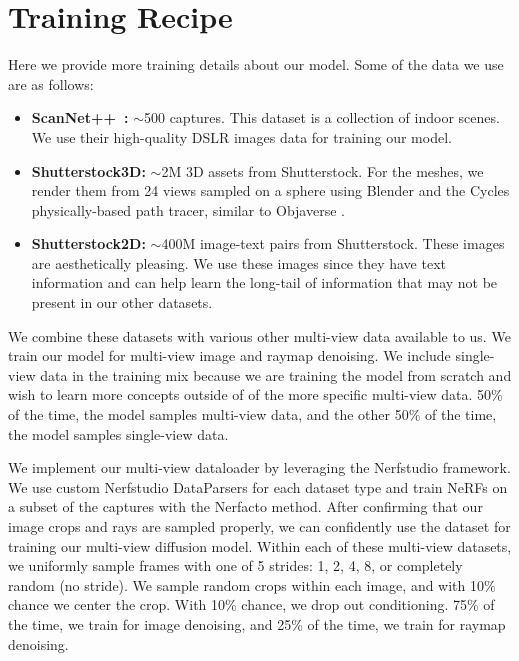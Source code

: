 \section{Training Recipe}

Here we provide more training details about our model. Some of the data we use are as follows:
\begin{itemize}
  \item \textbf{ScanNet++~\cite{yeshwanth2023scannet++}:}
  $\sim$500 captures. This dataset is a collection of indoor scenes. We use their high-quality DSLR images data for training our model.

  \item \textbf{Shutterstock3D:}
  $\sim$2M 3D assets from Shutterstock. For the meshes, we render them from 24 views sampled on a sphere using Blender and the Cycles physically-based path tracer, similar to Objaverse \cite{deitke2022objaverse,deitke2023n}.

  \item \textbf{Shutterstock2D:}
  $\sim$400M image-text pairs from Shutterstock.
  These images are aesthetically pleasing. We use these images since they have text information and can help learn the long-tail of information that may not be present in our other datasets.
\end{itemize}

\noindent
We combine these datasets with various other multi-view data available to us. We train our model for multi-view image and raymap denoising.
We include single-view data in the training mix because we are training the model from scratch and wish to learn more concepts outside of of the more specific multi-view data.
50\% of the time, the model samples multi-view data, and the other 50\% of the time, the model samples single-view data.

We implement our multi-view dataloader by leveraging the Nerfstudio \cite{tancik2023nerfstudio} framework.
We use custom Nerfstudio DataParsers for each dataset type and train NeRFs on a subset of the captures with the Nerfacto \cite{tancik2023nerfstudio} method.
After confirming that our image crops and rays are sampled properly, we can confidently use the dataset for training our multi-view diffusion model.
Within each of these multi-view datasets, we uniformly sample frames with one of 5 strides: 1, 2, 4, 8, or completely random (\ie no stride).
We sample random crops within each image, and with 10\% chance we center the crop.
With 10\% chance, we drop out conditioning.
75\% of the time, we train for image denoising, and 25\% of the time, we train for raymap denoising.

